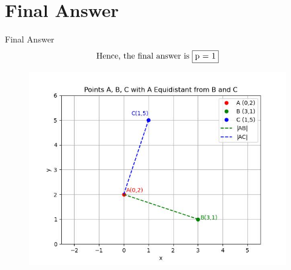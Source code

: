 \documentclass{beamer}
\theoremstyle{remark}
\begin{document}
\section{Final Answer}
\begin{frame}{Final Answer}
\begin{align}
    \text{Hence, the final answer is }\fbox{p = 1} 
\end{align}
\begin{figure}
    \centering
    \includegraphics[width=0.6\columnwidth]{figs/1.jpg}
\end{figure}
\end{frame}
\end{document}
